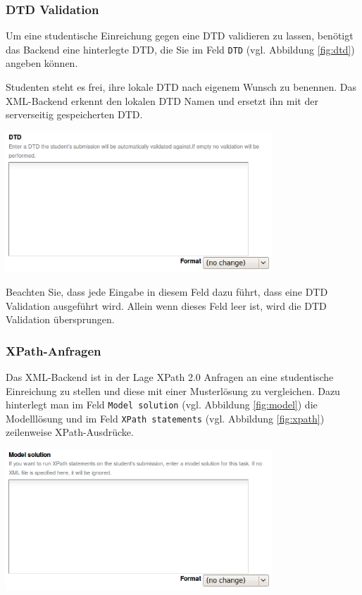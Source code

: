 \documentclass[a4paper]{scrartcl}
\newcommand{\anf}[1]{\glqq{}#1\grqq{}}
\begin{document}
  	  \subsubsection{DTD Validation}
  	  Um eine studentische Einreichung gegen eine DTD validieren zu lassen, benötigt das Backend eine hinterlegte DTD, die Sie im Feld \anf{\texttt{DTD}} (vgl. Abbildung \ref{fig:dtd}) angeben können.
  	  
  	  Studenten steht es frei, ihre lokale DTD nach eigenem Wunsch zu benennen. Das XML-Backend erkennt den lokalen DTD Namen und ersetzt ihn mit der serverseitig gespeicherten DTD.
  	  \begin{center}
        \captionsetup{type=figure}
	      \includegraphics[width=0.75\textwidth]{images/DTD.png}
	      \label{fig:dtd}
      \end{center}
  	  Beachten Sie, dass jede Eingabe in diesem Feld dazu führt, dass eine DTD Validation ausgeführt wird. Allein wenn dieses Feld leer ist, wird die DTD Validation übersprungen.
  	  
  	  \subsubsection{XPath-Anfragen}
  	  Das XML-Backend ist in der Lage XPath 2.0 Anfragen an eine studentische Einreichung zu stellen und diese mit einer Musterlösung zu vergleichen. Dazu hinterlegt man im Feld \anf{\texttt{Model solution}} (vgl. Abbildung \ref{fig:model}) die Modelllösung und im Feld \anf{\texttt{XPath statements}} (vgl. Abbildung \ref{fig:xpath}) zeilenweise XPath-Ausdrücke.
  	  
  	  \begin{center}
        \captionsetup{type=figure}
	      \includegraphics[width=0.75\textwidth]{images/Model.png}
	      \label{fig:model}
      \end{center}
      
\end{document}
